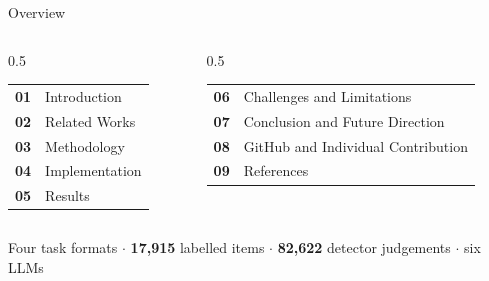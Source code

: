 \documentclass[aspectratio=169,11pt]{beamer}
\begin{document}
\begin{frame}{Overview}
\vspace{2mm}
\begin{columns}[T]
\begin{column}{0.5\textwidth}
\begin{tabular}{@{}p{7mm}l@{}}
\textbf{01} & Introduction\\[2.2mm]
\textbf{02} & Related Works\\[2.2mm]
\textbf{03} & Methodology\\[2.2mm]
\textbf{04} & Implementation\\[2.2mm]
\textbf{05} & Results\\
\end{tabular}
\end{column}
\begin{column}{0.5\textwidth}
\begin{tabular}{@{}p{7mm}l@{}}
\textbf{06} & Challenges and Limitations\\[2.2mm]
\textbf{07} & Conclusion and Future Direction\\[2.2mm]
\textbf{08} & GitHub and Individual Contribution\\[2.2mm]
\textbf{09} & References\\
\end{tabular}
\end{column}
\end{columns}
\vspace{6mm}
\begin{center}
\colorbox{panel}{\begin{minipage}{0.86\textwidth}\vspace{1mm}
\centering\small
Four task formats \;$\cdot$\; \textbf{17,915} labelled items \;$\cdot$\; \textbf{82,622} detector judgements \;$\cdot$\; six LLMs
\vspace{1mm}\end{minipage}}
\end{center}
\end{frame}
\end{document}
